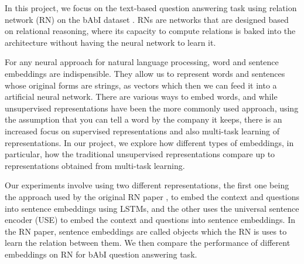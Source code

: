 \documentclass{article}
\begin{document}

In this project, we focus on the text-based question answering task using relation network (RN) \cite{Santoro2017} on the bAbI dataset \cite{Weston2015}. RNs are networks that are designed based on relational reasoning, where its capacity to compute relations is baked into the architecture without having the neural network to learn it. 

For any neural approach for natural language processing, word and sentence embeddings are indispensible. They allow us to represent words and sentences whose original forms are strings, as vectors which then we can feed it into a artificial neural network. There are various ways to embed words, and while unsupervised representations have been the more commonly used approach, using the assumption that you can tell a word by the company it keeps, there is an increased focus on supervised representations and also multi-task learning of representations. In our project, we explore how different types of embeddings, in particular, how the traditional unsupervised representations compare up to representations obtained from multi-task learning.





Our experiments involve using two different representations, the first one being the approach used by the original RN paper \cite{Santoro2017}, to embed the context and questions into sentence embeddings using LSTMs, and the other uses the universal sentence encoder (USE) \cite{Cer2018} to embed the context and questions into sentence embeddings. In the RN paper, sentence embeddings are called objects which the RN is uses to learn the relation between them. We then compare the performance of different embeddings on RN for bAbI question answering task.


\end{document}
